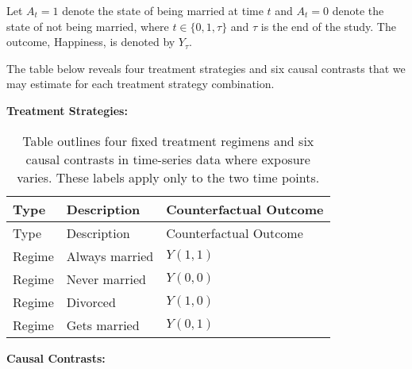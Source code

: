 \documentclass[
  single column]{article}
\begin{document}
Let \(A_t = 1\) denote the state of being married at time \(t\) and
\(A_t = 0\) denote the state of not being married, where
\(t \in \{0, 1, \tau\}\) and \(\tau\) is the end of the study. The
outcome, Happiness, is denoted by \(Y_\tau\).

The table below reveals four treatment strategies and six causal
contrasts that we may estimate for each treatment strategy combination.

\textbf{Treatment Strategies:}

\begin{longtable}[]{@{}lll@{}}
\caption{Table outlines four fixed treatment regimens and six causal
contrasts in time-series data where exposure varies. These labels apply
only to the two time
points.}\label{tbl-regimens-marriage}\tabularnewline
\toprule\noalign{}
Type & Description & Counterfactual Outcome \\
\midrule\noalign{}
\endfirsthead
\toprule\noalign{}
Type & Description & Counterfactual Outcome \\
\midrule\noalign{}
\endhead
\bottomrule\noalign{}
\endlastfoot
Regime & Always married & \(Y(1,1)\) \\
Regime & Never married & \(Y(0,0)\) \\
Regime & Divorced & \(Y(1,0)\) \\
Regime & Gets married & \(Y(0,1)\) \\
\end{longtable}

\textbf{Causal Contrasts:}
\end{document}
